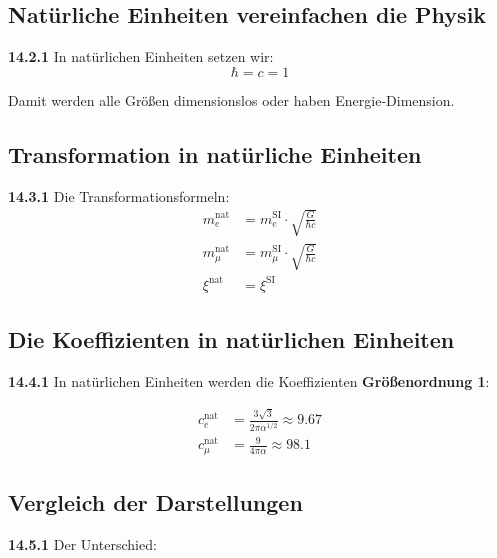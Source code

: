 \subsection{Natürliche Einheiten vereinfachen die Physik}

\noindent \textbf{14.2.1} In natürlichen Einheiten setzen wir:
\[
\hbar = c = 1
\]

Damit werden alle Größen dimensionslos oder haben Energie-Dimension.

\subsection{Transformation in natürliche Einheiten}

\noindent \textbf{14.3.1} Die Transformationsformeln:
\begin{align*}
	m_e^{\text{nat}} &= m_e^{\text{SI}} \cdot \sqrt{\frac{G}{\hbar c}} \\
	m_\mu^{\text{nat}} &= m_\mu^{\text{SI}} \cdot \sqrt{\frac{G}{\hbar c}} \\
	\xi^{\text{nat}} &= \xi^{\text{SI}}
\end{align*}

\subsection{Die Koeffizienten in natürlichen Einheiten}

\noindent \textbf{14.4.1} In natürlichen Einheiten werden die Koeffizienten \textbf{Größenordnung 1}:

\begin{align*}
	c_e^{\text{nat}} &= \frac{3\sqrt{3}}{2\pi\alpha^{1/2}} \approx 9.67 \\
	c_\mu^{\text{nat}} &= \frac{9}{4\pi\alpha} \approx 98.1
\end{align*}

\subsection{Vergleich der Darstellungen}

\noindent \textbf{14.5.1} Der Unterschied:


